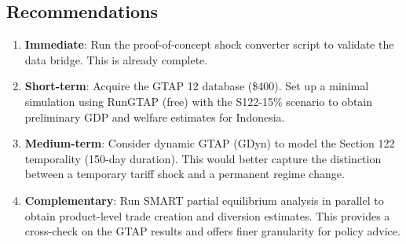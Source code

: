 \documentclass[12pt,a4paper]{article}
\begin{document}
\subsection{Recommendations}

\begin{enumerate}
    \item \textbf{Immediate}: Run the proof-of-concept shock converter script to validate the data bridge. This is already complete.

    \item \textbf{Short-term}: Acquire the GTAP 12 database (\$400). Set up a minimal simulation using RunGTAP (free) with the S122-15\% scenario to obtain preliminary GDP and welfare estimates for Indonesia.

    \item \textbf{Medium-term}: Consider dynamic GTAP (GDyn) to model the Section 122 temporality (150-day duration). This would better capture the distinction between a temporary tariff shock and a permanent regime change.

    \item \textbf{Complementary}: Run SMART partial equilibrium analysis in parallel to obtain product-level trade creation and diversion estimates. This provides a cross-check on the GTAP results and offers finer granularity for policy advice.
\end{enumerate}

\end{document}
